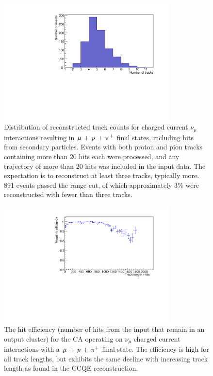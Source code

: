 \begin{figure}
    \centering
    \includegraphics[angle=-90,width=0.8\textwidth]{chapters/cellularautomaton_images/ccpi-trackcounts}
    \caption[Number of reconstructed tracks in \acs{CCPi} events]{\label{fig:ca-ccpi-trackcounts}Distribution of reconstructed track counts for charged current $\nu_\mu$ interactions resulting in $\mu\,+\,p\,+\,\pi^{+}$ final states, including hits from secondary particles. Events with both proton and pion tracks containing more than 20 hits each were processed, and any trajectory of more than 20 hits was included in the input data. The expectation is to reconstruct at least three tracks, typically more. 891 events passed the range cut, of which approximately $3\%$ were reconstructed with fewer than three tracks.}
\end{figure}

\begin{figure}
    \centering
    \includegraphics[angle=-90,width=0.8\textwidth]{chapters/cellularautomaton_images/ccpi-efficiency}
    \caption[Hit efficiency for \acs{CCPi} events reconstructed with a CA]{\label{fig:ca-ccpi-efficiency}The hit efficiency (number of hits from the input that remain in an output cluster) for the CA operating on $\nu_\mu$ charged current interactions with a $\mu\,+\,p\,+\,\pi^{+}$ final state. The efficiency is high for all track lengths, but exhibits the same decline with increasing track length as found in the CCQE reconstruction.}
\end{figure}

